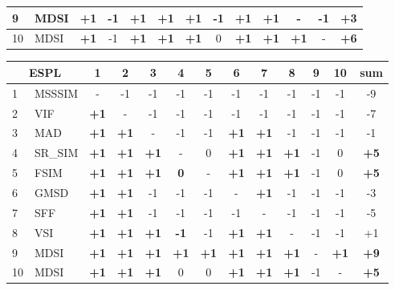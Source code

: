 \begin{table*}[htb]
{\begin{tabular}{|l|l|c|c|c|c|c|c|c|c|c|c||c|}
9           & MDSI             & \textbf{+1} & -1 & \textbf{+1} & \textbf{+1} & \textbf{+1} & -1          & \textbf{+1} & \textbf{+1} & -           & -1          & +3          \\ \hline
10          & MDSI            & \textbf{+1} & -1 & \textbf{+1} & \textbf{+1} & \textbf{+1} & 0           & \textbf{+1} & \textbf{+1} & \textbf{+1} & -           & \textbf{+6} \\ \hline
\end{tabular}
\hspace*{2 mm}
\begin{tabular}{|l|l|c|c|c|c|c|c|c|c|c|c||c|}
\hline
\multicolumn{2}{|c|}{ESPL} & 1           & 2           & 3           & 4           & 5           & 6           & 7           & 8           & 9  & 10          & sum         \\ \hline
1         & MSSSIM         & -           & -1          & -1          & -1          & -1          & -1          & -1          & -1          & -1 & -1          & -9          \\ \hline
2         & VIF            & \textbf{+1} & -           & -1          & -1          & -1          & -1          & -1          & -1          & -1 & -1          & -7          \\ \hline
3         & MAD            & \textbf{+1} & \textbf{+1} & -           & -1          & -1          & \textbf{+1} & \textbf{+1} & -1          & -1 & -1          & -1          \\ \hline
4         & SR\_SIM        & \textbf{+1} & \textbf{+1} & \textbf{+1} & -           & 0           & \textbf{+1} & \textbf{+1} & \textbf{+1} & -1 & 0           & \textbf{+5} \\ \hline
5         & FSIM          & \textbf{+1} & \textbf{+1} & \textbf{+1} & \textbf{0}  & -           & \textbf{+1} & \textbf{+1} & \textbf{+1} & -1 & 0           & \textbf{+5} \\ \hline
6         & GMSD           & \textbf{+1} & \textbf{+1} & -1          & -1          & -1          & -           & \textbf{+1} & -1          & -1 & -1          & -3          \\ \hline
7         & SFF            & \textbf{+1} & \textbf{+1} & -1          & -1          & -1          & -1          & -           & -1          & -1 & -1          & -5          \\ \hline
8         & VSI            & \textbf{+1} & \textbf{+1} & \textbf{+1} & \textbf{-1} & -1          & \textbf{+1} & \textbf{+1} & -           & -1 & -1          & +1          \\ \hline
9         & MDSI           & \textbf{+1} & \textbf{+1} & \textbf{+1} & \textbf{+1} & \textbf{+1} & \textbf{+1} & \textbf{+1} & \textbf{+1} & -  & \textbf{+1} & \textbf{+9} \\ \hline
10        & MDSI          & \textbf{+1} & \textbf{+1} & \textbf{+1} & 0           & 0           & \textbf{+1} & \textbf{+1} & \textbf{+1} & -1 & -           & \textbf{+5} \\ \hline
\end{tabular} }
\end{table*}



